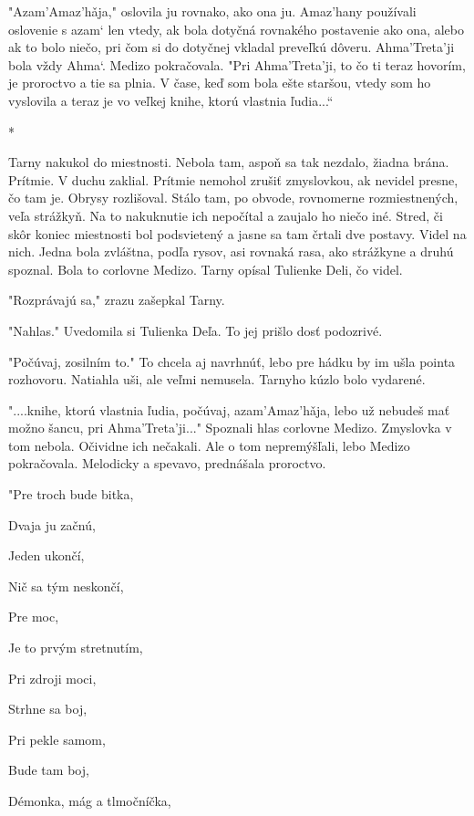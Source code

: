 \documentclass{book}
\begin{document}
"$ $Azam'Amaz'ha\v{}ja,"$ $ oslovila ju rovnako, ako ona ju. Amaz'hany používali oslovenie s azam‘ len vtedy, ak bola dotyčná rovnakého postavenie ako ona, alebo ak to bolo niečo, pri čom si do dotyčnej vkladal preveľkú dôveru. Ahma'Treta'ji bola vždy Ahma‘. Medizo pokračovala. "$ $Pri Ahma'Treta'ji, to čo ti teraz hovorím, je proroctvo a tie sa plnia. V čase, keď som bola ešte staršou, vtedy som ho vyslovila a teraz je vo veľkej knihe, ktorú vlastnia ľudia...“

\begin{center}
*
\end{center}

Tarny nakukol do miestnosti. Nebola tam, aspoň sa tak nezdalo, žiadna brána. Prítmie. V duchu zaklial. Prítmie nemohol zrušiť zmyslovkou, ak nevidel presne, čo tam je. Obrysy rozlišoval. Stálo tam, po obvode, rovnomerne rozmiestnených, veľa strážkyň. Na to nakuknutie ich nepočítal a zaujalo ho niečo iné. Stred, či skôr koniec miestnosti bol podsvietený a jasne sa tam črtali dve postavy. Videl na nich. Jedna bola zvláštna, podľa rysov, asi rovnaká rasa, ako strážkyne a druhú spoznal. Bola to corlovne Medizo. Tarny opísal Tulienke Deli, čo videl.

"$ $Rozprávajú sa,"$ $ zrazu zašepkal Tarny.

"$ $Nahlas."$ $ Uvedomila si Tulienka Deľa. To jej prišlo dosť podozrivé.

"$ $Počúvaj, zosilním to."$ $ To chcela aj navrhnúť, lebo pre hádku by im ušla pointa rozhovoru. Natiahla uši, ale veľmi nemusela. Tarnyho kúzlo bolo vydarené.

"$ $....knihe, ktorú vlastnia ľudia, počúvaj, azam'Amaz'ha\v{}ja, lebo už nebudeš mať možno šancu, pri Ahma'Treta'ji..."$ $ Spoznali hlas corlovne Medizo. Zmyslovka v tom nebola. Očividne ich nečakali. Ale o tom nepremýšľali, lebo Medizo pokračovala. Melodicky a spevavo, prednášala proroctvo.

"$ $Pre troch bude bitka,

Dvaja ju začnú,

Jeden ukončí,

Nič sa tým neskončí,

Pre moc,

Je to prvým stretnutím,

Pri zdroji moci,

Strhne sa boj,

Pri pekle samom,

Bude tam boj,

Démonka, mág a tlmočníčka,
\end{document}
